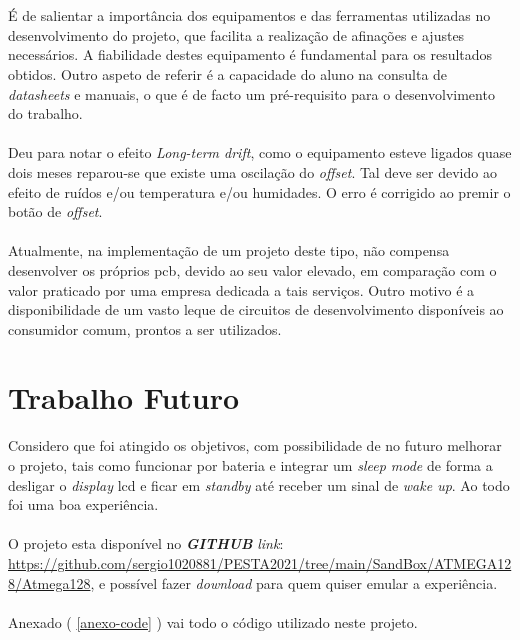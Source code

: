 \\
\\
É de salientar a importância dos equipamentos e das ferramentas utilizadas no desenvolvimento do projeto, que facilita a realização de afinações e ajustes necessários. A fiabilidade destes equipamento é fundamental para os resultados obtidos.
Outro aspeto de referir é a capacidade do aluno na consulta de \textit{datasheets} e manuais, o que é de facto um pré-requisito para o desenvolvimento do trabalho.
\\
\\
Deu para notar o efeito \textit{Long-term drift}, como o equipamento esteve ligados quase dois meses reparou-se que existe uma oscilação do \textit{offset}. Tal deve ser devido ao efeito de ruídos e/ou temperatura e/ou humidades. O erro é corrigido ao premir o botão de \textit{offset}.
\\
\\
Atualmente, na implementação de um projeto deste tipo, não compensa desenvolver os próprios \acs{pcb}, devido ao seu valor elevado, em comparação com o valor praticado por uma empresa dedicada a tais serviços. Outro motivo é a disponibilidade  de um vasto leque de circuitos de desenvolvimento disponíveis ao consumidor comum, prontos a ser utilizados.
\section{Trabalho Futuro}
Considero que foi atingido os objetivos, com possibilidade de no futuro melhorar o projeto, tais como funcionar por bateria e integrar um \textit{sleep mode} de forma a desligar o \textit{display} \acs{lcd} e ficar em \textit{standby} até receber um sinal de \textit{wake up}. Ao todo foi uma boa experiência.
\\
\\
O projeto esta disponível no \textit{\textbf{GITHUB}} \textit{link}: \url{https://github.com/sergio1020881/PESTA2021/tree/main/SandBox/ATMEGA128/Atmega128}, e possível fazer \textit{download} para quem quiser emular a experiência.
\\
\\
Anexado ( \ref{anexo-code} ) vai todo o código utilizado neste projeto.
\begin{comment}
Sensitivity,Long-Term Drift e Temperature Effects (Span temperature hysteresis).
\end{comment}
